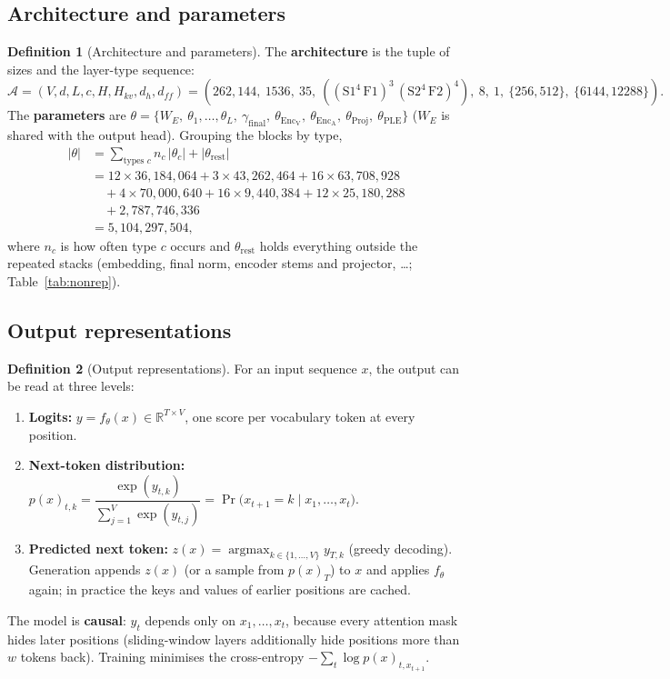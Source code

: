 \documentclass[10pt,a4paper]{article}
\newcommand{\op}[1]{\operatorname{#1}}
\theoremstyle{definition}
\newtheorem{definition}{Definition}[section]
\begin{document}
\subsection{Architecture and parameters}
\begin{definition}[Architecture and parameters]
The \textbf{architecture} is the tuple of sizes and the layer-type sequence:
\begin{equation}
  \mathcal{A} = (V,d,L,c,H,H_{kv},d_h,d_{ff}) = (262{,}144,\ 1536,\ 35,\ ((\mathrm{S1}^{4}\,\mathrm{F1})^{3}\,(\mathrm{S2}^{4}\,\mathrm{F2})^{4}),\ 8,\ 1,\ \{256,512\},\ \{6144,12288\}).
\end{equation}
The \textbf{parameters} are $\theta=\{W_E,\ \theta_1,\dots,\theta_L,\ \gamma_{\mathrm{final}},\ \theta_{\op{Enc_V}},\ \theta_{\op{Enc_A}},\ \theta_{\op{Proj}},\ \theta_{\mathrm{PLE}}\}$ ($W_E$ is shared with the output head). Grouping the blocks by type,
\begin{align*}
  |\theta| &= \sum_{\text{types } c} n_c\,|\theta_c| + |\theta_{\mathrm{rest}}| \\
  &= 12\times36{,}184{,}064 + 3\times43{,}262{,}464 + 16\times63{,}708{,}928 \\
  &\quad+ 4\times70{,}000{,}640 + 16\times9{,}440{,}384 + 12\times25{,}180{,}288 \\
  &\quad+ 2{,}787{,}746{,}336 \\
  &= 5{,}104{,}297{,}504,
\end{align*}
where $n_c$ is how often type $c$ occurs and $\theta_{\mathrm{rest}}$ holds everything outside the repeated stacks (embedding, final norm, encoder stems and projector, \dots; Table~\ref{tab:nonrep}).
\end{definition}
\subsection{Output representations}
\begin{definition}[Output representations]
For an input sequence $x$, the output can be read at three levels:
\begin{enumerate}
\item \textbf{Logits:} $y=f_\theta(x)\in\mathbb{R}^{T\times V}$, one score per vocabulary token at every position.
\item \textbf{Next-token distribution:} $p(x)_{t,k}=\dfrac{\exp(y_{t,k})}{\sum_{j=1}^{V}\exp(y_{t,j})}=\Pr\big(x_{t+1}=k\mid x_{1},\dots,x_{t}\big)$.
\item \textbf{Predicted next token:} $z(x)=\operatorname{argmax}_{k\in\{1,\dots,V\}} y_{T,k}$ (greedy decoding). Generation appends $z(x)$ (or a sample from $p(x)_{T}$) to $x$ and applies $f_\theta$ again; in practice the keys and values of earlier positions are cached.
\end{enumerate}
The model is \textbf{causal}: $y_t$ depends only on $x_1,\dots,x_t$, because every attention mask hides later positions (sliding-window layers additionally hide positions more than $w$ tokens back). Training minimises the cross-entropy $-\sum_{t}\log p(x)_{t,x_{t+1}}$.
\end{definition}
\end{document}
